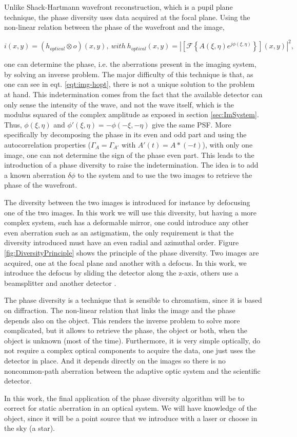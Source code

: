 Unlike Shack-Hartmann wavefront reconstruction, which is a pupil plane technique, the phase diversity uses data acquired at the focal plane. Using the non-linear relation between the phase of the wavefront and the image, 

\begin{equation}
i(x,y) = (h_{optical}\otimes o)(x,y), \ with \ h_{optical}(x,y) = |\left[\mathcal{F}\left\lbrace A(\xi,\eta)e^{j\phi(\xi,\eta)} \right\rbrace\right](x,y)|^2,
\label{eqt:img-hopt}
\end{equation}

one can determine the phase, i.e. the aberrations present in the imaging system, by solving an inverse problem. The major difficulty of this technique is that, as one can see in eqt. \eqref{eqt:img-hopt}, there is not a unique solution to the problem at hand. This indetermination comes from the fact that the available detector can only sense the intensity of the wave, and not the wave itself, which is the modulus squared of the complex amplitude as exposed in section \ref{sec:ImSystem}. Thus, $\phi(\xi,\eta)$ and $\phi'(\xi,\eta)=-\phi(-\xi,-\eta)$ give the same PSF.
More specifically by decomposing the phase in its even and odd part and using the autocorrelation properties ($\Gamma_A = \Gamma_{A'}$ with $A'(t) = A*(-t)$), with only one image, one can not determine the sign of the phase even part. This leads to the introduction of a phase diversity to raise the indetermination. The idea is to add a known aberration $\delta\phi$ to the system and to use the two images to retrieve the phase of the wavefront.

The diversity between the two images is introduced for instance by defocusing one of the two images. In this work we will use this diversity, but having a more complex system, such has a deformable mirror, one could introduce any other even aberration such as an astigmatism, the only requirement is that the diversity introduced must have an even radial and azimuthal order. Figure \ref{fig:DiversityPrinciple} shows the principle of the phase diversity. Two images are acquired, one at the focal plane and another with a defocus. In this work, we introduce the defocus by sliding the detector along the z-axis, others use a beamsplitter and another detector \citep{mugnier_2006}.

The phase diversity is a technique that is sensible to chromatism, since it is based on diffraction. The non-linear relation that links the image and the phase depends also on the object. This renders the inverse problem to solve more complicated, but it allows to retrieve the phase, the object or both, when the object is unknown (most of the time). Furthermore, it is very simple optically, do not require a complex optical components to acquire the data, one just uses the detector in place. And it depends directly on the images so there is no noncommon-path aberration between the adaptive optic system and the scientific detector.

In this work, the final application of the phase diversity algorithm will be to correct for static aberration in an optical system. We will have knowledge of the object, since it will be a point source that we introduce with a laser or choose in the sky (a star).